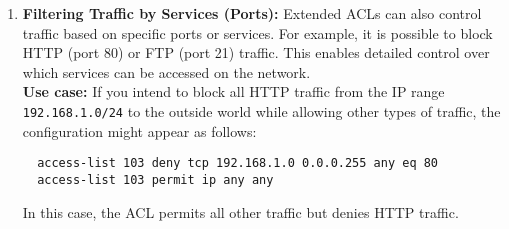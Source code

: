 \documentclass[11pt,a4paper]{article}
\begin{document}
\begin{enumerate}
                \item \textbf{Filtering Traffic by Services (Ports):} Extended ACLs can also control traffic based on specific ports or services. For example, it is possible to block HTTP (port 80) or FTP (port 21) traffic. This enables detailed control over which services can be accessed on the network.
                \\[1em]
                \textbf{Use case:} If you intend to block all HTTP traffic from the IP range \lstinline{192.168.1.0/24} to the outside world while allowing other types of traffic, the configuration might appear as follows:
\begin{lstlisting}
  access-list 103 deny tcp 192.168.1.0 0.0.0.255 any eq 80
  access-list 103 permit ip any any                    
\end{lstlisting}
                In this case, the ACL permits all other traffic but denies HTTP traffic.
            \end{enumerate}
\end{document}
